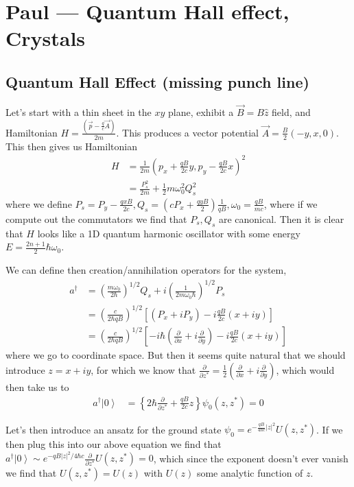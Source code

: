 \documentclass[12pt]{article}
\newcommand{\ket}[1]{\left|#1\right>}
\newcommand{\pd}[2]{\frac{\partial#1}{\partial#2}}
\newcommand{\abs}[1]{\left|#1\right|}
\begin{document}
\section{Paul --- Quantum Hall effect, Crystals}

\subsection{Quantum Hall Effect (missing punch line)}

Let's start with a thin sheet in the $xy$ plane, exhibit a $\vec{B} = B\hat{z}$ field, and Hamiltonian $H = \frac{\left( \vec{p} - \frac{q}{c}\vec{A} \right)}{2m}$. This produces a vector potential $\vec{A} = \frac{B}{2}\left( -y,x,0 \right)$. This then gives us Hamiltonian
\begin{align}
    H &= \frac{1}{2m}\left( p_x + \frac{qB}{2c}y, p_y - \frac{qB}{2c}x \right)^2\\
    &= \frac{P_s^2}{2m} + \frac{1}{2}m\omega_0^2 Q_s^2
\end{align}
where we define $P_s = P_y - \frac{qxB}{2c}, Q_s = \left(cP_{x} + \frac{qyB}{2}\right)\frac{1}{qB}, \omega_0 = \frac{qB}{mc}$, where if we compute out the commutators we find that $P_s, Q_s$ are canonical. Then it is clear that $H$ looks like a 1D quantum harmonic oscillator with some energy $E = \frac{2n + 1}{2}\hbar \omega_0$. 

We can define then creation/annihilation operators for the system, 
\begin{align}
    a^\dagger &= \left( \frac{m\omega_0}{2\hbar} \right)^{1/2}Q_s + i\left( \frac{1}{2m\omega_0\hbar} \right)^{1/2}P_s\\
    &= \left( \frac{c}{2\hbar qB} \right)^{1/2} \left[ \left( P_x + iP_y \right) - i\frac{qB}{2c}\left( x + iy \right) \right]\\
    &= \left( \frac{c}{2\hbar qB} \right)^{1/2} \left[ -i\hbar\left( \pd{}{x} + i\pd{}{y} \right) - i\frac{qB}{2c}\left( x + iy \right) \right]
\end{align}
where we go to coordinate space. But then it seems quite natural that we should introduce $z = x + iy$, for which we know that $\pd{}{z^*} = \frac{1}{2}\left( \pd{}{x} + i\pd{}{y} \right)$, which would then take us to
\begin{align}
    a^\dagger\ket{0} &= \left\{ 2\hbar \pd{}{z^*} + \frac{qB}{2c}z \right\}\psi_0(z,z^*) = 0
\end{align}

Let's then introduce an ansatz for the ground state $\psi_0 = e^{-\frac{qB}{4\hbar c}\abs{z}^2}U(z,z^*)$. If we then plug this into our above equation we find that $a^\dagger\ket{0} \sim e^{-qB\abs{z}^2/4\hbar c} \pd{}{z^*}U(z,z^*) = 0$, which since the exponent doesn't ever vanish we find that $U(z,z^*) = U(z)$ with $U(z)$ some analytic function of $z$.
\end{document}
